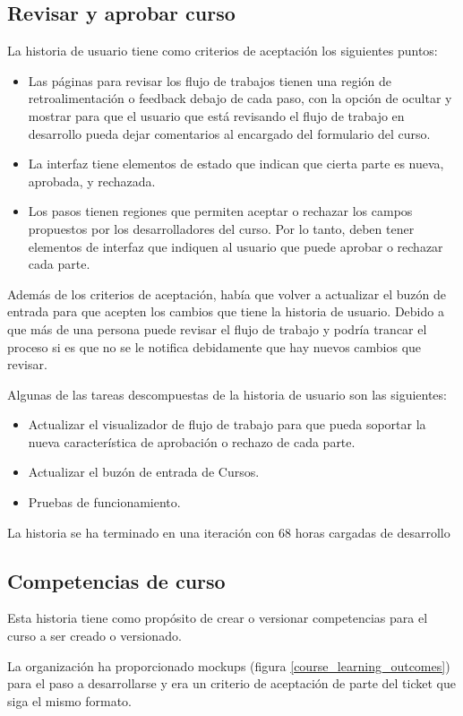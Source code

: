 \subsection{Revisar y aprobar curso}
La historia de usuario tiene como criterios de aceptación los siguientes puntos:
\begin{itemize}
	\item Las páginas para revisar los flujo de trabajos tienen una región de retroalimentación o feedback debajo de cada paso, con la opción de ocultar y mostrar para que el usuario que está revisando el flujo de trabajo en desarrollo pueda dejar comentarios al encargado del formulario del curso.
	\item La interfaz tiene elementos de estado que indican que cierta parte es nueva, aprobada, y rechazada.
	\item Los pasos tienen regiones que permiten aceptar o rechazar los campos propuestos por los desarrolladores del curso. Por lo tanto, deben tener elementos de interfaz que indiquen al usuario que puede aprobar o rechazar cada parte.
\end{itemize}
Además de los criterios de aceptación, había que volver a actualizar el buzón de entrada para que acepten los cambios que tiene la historia de usuario. Debido a que más de una persona puede revisar el flujo de trabajo y podría trancar el proceso si es que no se le notifica debidamente que hay nuevos cambios que revisar.

Algunas de las tareas descompuestas de la historia de usuario son las siguientes:
\begin{itemize}
	\item Actualizar el visualizador de flujo de trabajo para que pueda soportar la nueva característica de aprobación o rechazo de cada parte.
	\item Actualizar el buzón de entrada de Cursos.
	\item Pruebas de funcionamiento.
\end{itemize}

La historia se ha terminado en una iteración con 68 horas cargadas de desarrollo

\subsection{Competencias de curso}
Esta historia tiene como propósito de crear o versionar competencias para el curso a ser creado o versionado. 

La organización ha proporcionado mockups (figura \ref{course_learning_outcomes}) para el paso a desarrollarse y era un criterio de aceptación de parte del ticket que siga el mismo formato.


